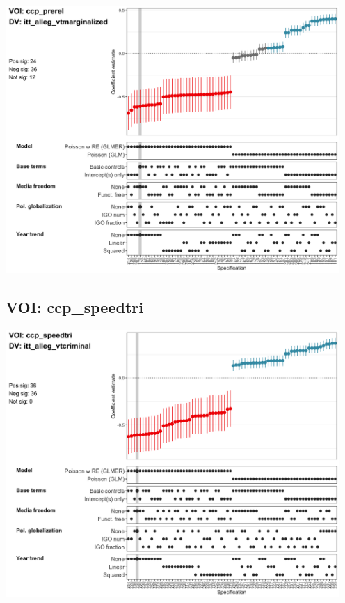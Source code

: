 \documentclass[]{article}
\begin{document}
\includegraphics[height=4in]{../output/figures-robustness/specplot-ccp_prerel-itt_alleg_vtmarginalized.png}

\hypertarget{voi-ccp_speedtri}{%
\subsection{VOI: ccp\_speedtri}\label{voi-ccp_speedtri}}

\includegraphics[height=4in]{../output/figures-robustness/specplot-ccp_speedtri-itt_alleg_vtcriminal.png}
\end{document}
